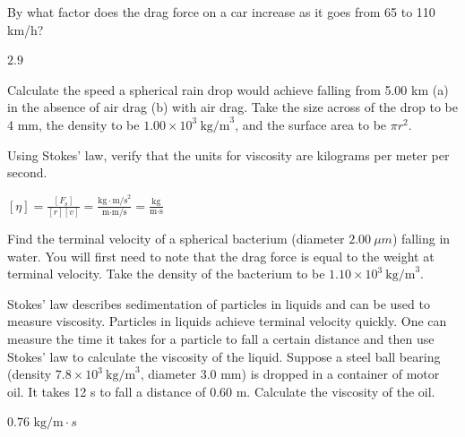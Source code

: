 \documentclass[
]{book}
\newenvironment{problems-exercises}{}{}
\begin{document}
\begin{problems-exercises}
\hypertarget{fs-id1165298726139}{}
\leavevmode\hypertarget{fs-id1165298713942}{}%
By what factor does the drag force on a car increase as it goes from 65
to 110 km/h?

\leavevmode\hypertarget{eip-id1626548}{}%
\({2\text{.}9}{}\)

\hypertarget{fs-id1165298928445}{}
\leavevmode\hypertarget{fs-id1165296715659}{}%
Calculate the speed a spherical rain drop would achieve falling from
5.00 km (a) in the absence of air drag (b) with air drag. Take the size
across of the drop to be 4 mm, the density to be
\({1\text{.}{\text{00} \times \text{10}^{3}}\ \text{kg/m}^{3}}{}\), and
the surface area to be \({\pi r}^{2}{}\).

\hypertarget{fs-id1165296534353}{}
\leavevmode\hypertarget{fs-id1165298597665}{}%
Using Stokes' law, verify that the units for viscosity are kilograms
per meter per second.

\leavevmode\hypertarget{eip-id1351403}{}%
\({{{\left\lbrack \eta \right\rbrack = \frac{\left\lbrack F_{\text{s}} \right\rbrack}{\left\lbrack r \right\rbrack\left\lbrack v \right\rbrack}} = \frac{\text{kg} \cdot \text{m/s}^{2}}{\text{m} \cdot \text{m/s}}} = \frac{\text{kg}}{\text{m} \cdot \text{s}}}{}\)

\hypertarget{fs-id1165298534706}{}
\leavevmode\hypertarget{fs-id1165296377552}{}%
Find the terminal velocity of a spherical bacterium (diameter
\(2.00\ \mu m{}\)) falling in water. You will first need to note that the
drag force is equal to the weight at terminal velocity. Take the density
of the bacterium to be
\({1\text{.}{\text{10} \times \text{10}^{3}\ }\text{kg/m}^{3}}{}\).

\hypertarget{fs-id1165298696745}{}
\leavevmode\hypertarget{fs-id1165298937224}{}%
Stokes' law describes sedimentation of particles in liquids and can be
used to measure viscosity. Particles in liquids achieve terminal
velocity quickly. One can measure the time it takes for a particle to
fall a certain distance and then use Stokes' law to calculate the
viscosity of the liquid. Suppose a steel ball bearing (density
\({7\text{.}{8 \times \text{10}^{3}}\ \text{kg/m}^{3}}{}\), diameter
\({3\text{.0\ \ mm}}{}\)) is dropped in a container of motor oil. It takes
12 s to fall a distance of 0.60 m. Calculate the viscosity of the oil.

\leavevmode\hypertarget{eip-id1586160}{}%
\(0\text{.}\text{76\ kg/m} \cdot s\)

\end{problems-exercises}
\end{document}
